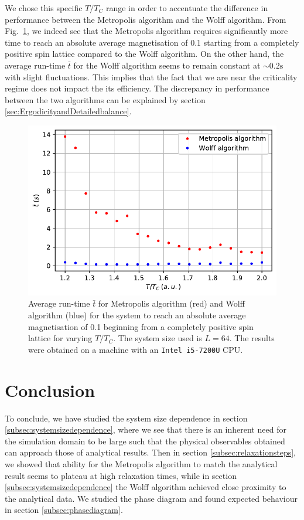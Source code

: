 \documentclass[pra,aps,superscriptaddress,amssymb,amsmath,reprint,noeprint,floatfix]{revtex4-2}
\begin{document}
We chose this specific $T/T_C$ range in order to accentuate the difference in performance between the Metropolis algorithm and the Wolff algorithm. From Fig.\ \ref{fig:benchmark}, we indeed see that the Metropolis algorithm requires significantly more time to reach an absolute average magnetisation of 0.1 starting from a completely positive spin lattice compared to the Wolff algorithm. On the other hand, the average run-time $\bar t$ for the Wolff algorithm seems to remain constant at $\sim 0.2\mathrm{s}$ with slight fluctuations. This implies that the fact that we are near the criticality regime does not impact the its efficiency. The discrepancy in performance between the two algorithms can be explained by section \ref{sec:ErgodicityandDetailedbalance}.

\begin{figure}[H]
    \centering
    \includegraphics[width=0.9\linewidth]{Figures/benchmark.pdf}
    \caption{Average run-time $\bar t$ for Metropolis algorithm (red) and Wolff algorithm (blue) for the system to reach an absolute average magnetisation of 0.1 beginning from a completely positive spin lattice for varying $T/T_C$. The system size used is $L=64$. The results were obtained on a machine with an \texttt{Intel i5-7200U} CPU.}
    \label{fig:benchmark}
\end{figure}


\section{\label{sec:conclusion}Conclusion}

To conclude, we have studied the system size dependence in section \ref{subsec:systemsizedependence}, where we see that there is an inherent need for the simulation domain to be large such that the physical observables obtained can approach those of analytical results. Then in section \ref{subsec:relaxationsteps}, we showed that ability for the Metropolis algorithm to match the analytical result seems to plateau at high relaxation times, while in section \ref{subsec:systemsizedependence} the Wolff algorithm achieved close proximity to the analytical data. We studied the phase diagram and found expected behaviour in section \ref{subsec:phasediagram}.
\end{document}
